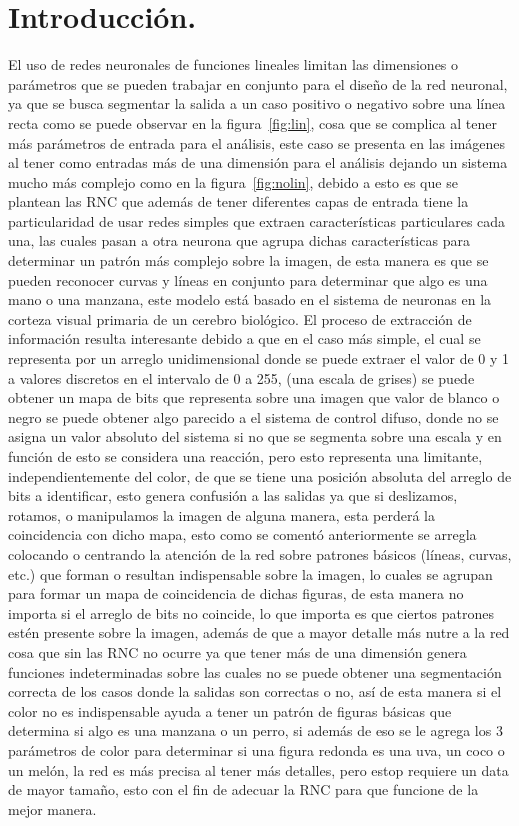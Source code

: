 \documentclass[a4paper, 12pt]{article}
\begin{document}
    \section{Introducción.}
    El uso de redes neuronales de funciones lineales limitan las dimensiones o parámetros que se pueden trabajar en conjunto para el diseño de la red neuronal, ya que se busca segmentar la salida a un caso positivo o negativo sobre una línea recta como se puede observar en la figura~\ref{fig:lin}, cosa que se complica al tener más parámetros de entrada para el análisis, este caso se presenta en las imágenes al tener como entradas más de una dimensión para el análisis dejando un sistema mucho más complejo como en la figura~\ref{fig:nolin}, debido a esto es que se plantean las RNC que además de tener diferentes capas de entrada tiene la particularidad de usar redes simples que extraen características particulares cada una, las cuales pasan a otra neurona que agrupa dichas características para determinar un patrón más complejo sobre la imagen, de esta manera es que se pueden reconocer curvas y líneas en conjunto para determinar que algo es una mano o una manzana, este modelo está basado en el sistema de neuronas en la corteza visual primaria de un cerebro biológico. 
    El proceso de extracción de información resulta interesante debido a que en el caso más simple, el cual se representa por un arreglo unidimensional donde se puede extraer el valor de 0 y 1 a valores discretos en el intervalo de 0 a 255, (una escala de grises) se puede obtener un mapa de bits que representa sobre una imagen que valor de blanco o negro se puede obtener algo parecido a el sistema de control difuso, donde no se asigna un valor absoluto del sistema si no que se segmenta sobre una escala y en función de esto se considera una reacción, pero esto representa una limitante, independientemente del color, de que se tiene una posición absoluta del arreglo de bits a identificar, esto genera confusión a las salidas ya que si deslizamos, rotamos, o manipulamos la imagen de alguna manera, esta perderá la coincidencia con dicho mapa, esto como se comentó anteriormente se arregla colocando o centrando la atención de la red sobre patrones básicos (líneas, curvas, etc.) que forman o resultan indispensable sobre la imagen, lo cuales se agrupan para formar un mapa de coincidencia de dichas figuras, de esta manera no importa si el arreglo de bits no coincide, lo que importa es que ciertos patrones estén presente sobre la imagen, además de que a mayor detalle más nutre a la red cosa que sin las RNC no ocurre ya que tener más de una dimensión genera funciones indeterminadas sobre las cuales no se puede obtener una segmentación correcta de los casos donde la salidas son correctas o no, así de esta manera si el color no es indispensable ayuda a tener un patrón de figuras básicas que determina si algo es una manzana o un perro, si además de eso se le agrega los 3 parámetros de color para determinar si una figura redonda es una uva, un coco o un melón, la red es más precisa al tener más detalles, pero estop requiere un data de mayor tamaño, esto con el fin de adecuar la RNC para que funcione de la mejor manera. 
\end{document}

